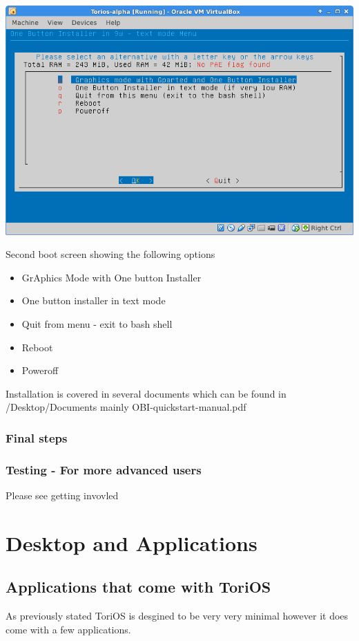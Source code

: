 \documentclass[12pt,a4paper]{book}
\begin{document}
\includegraphics[width=0.7\linewidth]{boot-screen2}

Second boot screen showing the following options \\

\begin{itemize}
\item{GrAphics Mode with One button Installer}
\item {One button installer in text mode}
\item{Quit from menu - exit to bash shell}
\item{Reboot}
\item{Poweroff}
\end{itemize}


Installation is covered in several documents which can be found in /Desktop/Documents
mainly 
OBI-quickstart-manual.pdf



\subsection{Final steps}

\subsection{Testing - For more advanced users}

Please see getting invovled

 
\chapter{Desktop and Applications}

\section{Applications that come with ToriOS}
As previously stated ToriOS is desgined to be very very minimal however it does come with a few applications. 
\end{document}
